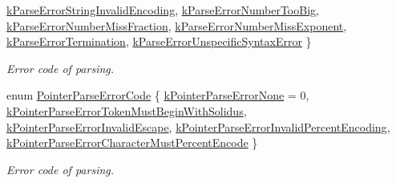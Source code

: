 \begin{DoxyCompactItemize}
\hyperlink{group___r_a_p_i_d_j_s_o_n___e_r_r_o_r_s_gga8d4b32dfc45840bca189ade2bbcb6ba7a17ecb2ed1524b513d64a93f4a7a8b456}{k\+Parse\+Error\+String\+Invalid\+Encoding}, 
\hyperlink{group___r_a_p_i_d_j_s_o_n___e_r_r_o_r_s_gga8d4b32dfc45840bca189ade2bbcb6ba7ae52aaa70fde46e4cc422420309700b82}{k\+Parse\+Error\+Number\+Too\+Big}, 
\hyperlink{group___r_a_p_i_d_j_s_o_n___e_r_r_o_r_s_gga8d4b32dfc45840bca189ade2bbcb6ba7a08a2cc2b4cacfba1673ed536eee229ce}{k\+Parse\+Error\+Number\+Miss\+Fraction}, 
\hyperlink{group___r_a_p_i_d_j_s_o_n___e_r_r_o_r_s_gga8d4b32dfc45840bca189ade2bbcb6ba7a82cdbd740e22b819a70d05e585c2a442}{k\+Parse\+Error\+Number\+Miss\+Exponent}, 
\newline
\hyperlink{group___r_a_p_i_d_j_s_o_n___e_r_r_o_r_s_gga8d4b32dfc45840bca189ade2bbcb6ba7a6fed2d9a15f88540a1ba785f0de2cbe6}{k\+Parse\+Error\+Termination}, 
\hyperlink{group___r_a_p_i_d_j_s_o_n___e_r_r_o_r_s_gga8d4b32dfc45840bca189ade2bbcb6ba7a2bec6b26bddd3e093a37fc0d6399e0be}{k\+Parse\+Error\+Unspecific\+Syntax\+Error}
 \}\begin{DoxyCompactList}\small\item\em Error code of parsing. \end{DoxyCompactList}
\item 
enum \hyperlink{group___r_a_p_i_d_j_s_o_n___e_r_r_o_r_s_gacb2e274f33e54d91b96e9883a99a98be}{Pointer\+Parse\+Error\+Code} \{ \newline
\hyperlink{group___r_a_p_i_d_j_s_o_n___e_r_r_o_r_s_ggacb2e274f33e54d91b96e9883a99a98bea81e2b6fbd1bf4ac890ddb7779265e3a0}{k\+Pointer\+Parse\+Error\+None} = 0, 
\hyperlink{group___r_a_p_i_d_j_s_o_n___e_r_r_o_r_s_ggacb2e274f33e54d91b96e9883a99a98bea5821696a2ab6cbccdc8288cbe6e81c77}{k\+Pointer\+Parse\+Error\+Token\+Must\+Begin\+With\+Solidus}, 
\hyperlink{group___r_a_p_i_d_j_s_o_n___e_r_r_o_r_s_ggacb2e274f33e54d91b96e9883a99a98bea4d2a7e511d717fd1d2f532ef5fcf821b}{k\+Pointer\+Parse\+Error\+Invalid\+Escape}, 
\hyperlink{group___r_a_p_i_d_j_s_o_n___e_r_r_o_r_s_ggacb2e274f33e54d91b96e9883a99a98beac0c1b013c0db34dcc5a47fc1ee7a8c35}{k\+Pointer\+Parse\+Error\+Invalid\+Percent\+Encoding}, 
\newline
\hyperlink{group___r_a_p_i_d_j_s_o_n___e_r_r_o_r_s_ggacb2e274f33e54d91b96e9883a99a98beabd7eae93627f74267009a03679b6dc38}{k\+Pointer\+Parse\+Error\+Character\+Must\+Percent\+Encode}
 \}\begin{DoxyCompactList}\small\item\em Error code of parsing. \end{DoxyCompactList}
\end{DoxyCompactItemize}
